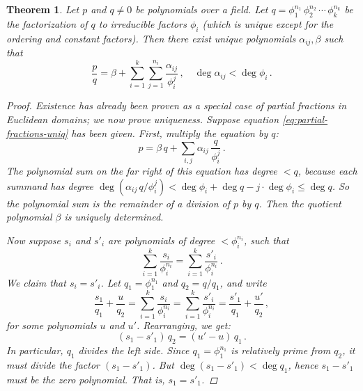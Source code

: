 \documentclass[12pt]{article}
\newtheorem{thm}{Theorem}
\begin{document}
\begin{thm}
\label{thm:partial-fractions-uniq}
Let $p$ and $q \neq 0$ be polynomials over a field.
Let $q = \phi_1^{n_1} \, \phi_2^{n_2} \, \dotsb \, \phi_k^{n_k}$
be the factorization of $q$ to irreducible factors $\phi_i$
(which is unique except for the ordering and constant factors).
Then there exist unique polynomials $\alpha_{ij}, \beta$
such
that
\begin{equation}
\label{eq:partial-fractions-uniq}
\frac{p}{q} = \beta + \sum_{i=1}^k \sum_{j=1}^{n_i} \frac{\alpha_{ij}}{\phi_i^j}\,, \quad 
\deg \alpha_{ij} < \deg \phi_i\,.
\end{equation}
\begin{proof}
Existence has already been proven as a special case of
partial fractions in Euclidean domains; we now prove uniqueness.  
Suppose equation \eqref{eq:partial-fractions-uniq} has been given.
First, multiply the equation by $q$:
\[
p = \beta \, q + \sum_{i,j} \alpha_{ij} \, \frac{q}{\phi_i^j}\,.
\]
The polynomial sum on the far right of this equation
has degree $< q$, because
each summand has degree 
$\deg (\alpha_{ij} \, q/\phi_i^j) < \deg \phi_i + \deg q - j \cdot \deg \phi_i \leq \deg q$.
So the polynomial sum is the remainder of a division of $p$ by $q$.
Then the quotient polynomial $\beta$ is uniquely determined.

Now suppose $s_i$ and $s'_i$ are polynomials of degree $< \phi_i^{n_i}$,
such that
\begin{equation}
\label{eq:pf-s1-unique}
\sum_{i=1}^k \frac{s_i}{\phi_i^{n_i}} = \sum_{i=1}^k \frac{s'_i}{\phi_i^{n_i}}\,.
\end{equation}
We claim that $s_i = s'_i$.  Let $q_1 = \phi_1^{n_1}$ and $q_2 = q/q_1$,
and write
\[
\frac{s_1}{q_1} + \frac{u}{q_2} = 
\sum_{i=1}^k \frac{s_i}{\phi_i^{n_i}} =
\sum_{i=1}^k \frac{s'_i}{\phi_i^{n_i}} = \frac{s'_1}{q_1} + \frac{u'}{q_2}\,,
\]
for some polynomials $u$ and $u'$.
Rearranging, we get:
\[
(s_1 - s'_1) \, q_2 = (u' - u) \, q_1\,.
\]
In particular, $q_1$ divides the left side.
Since $q_1 = \phi_1^{n_1}$ is relatively prime from $q_2$, it must divide 
the factor $(s_1 - s'_1)$.  But $\deg (s_1 - s'_1) < \deg q_1$,
hence $s_1 - s'_1$ must be the zero polynomial. That is, $s_1 = s'_1$.


\end{proof}
\end{thm}
\end{document}
